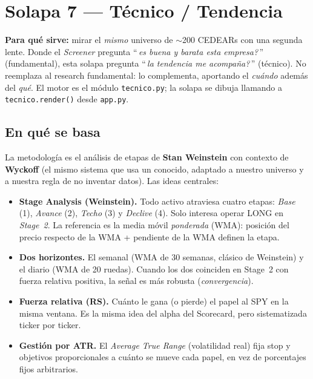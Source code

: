 \documentclass[11pt,a4paper]{article}
\newcommand{\code}[1]{\texttt{#1}}
\newcommand{\fpath}[1]{\texttt{#1}}
\begin{document}
\section{Solapa 7 --- T\'ecnico / Tendencia}

\textbf{Para qu\'e sirve:} mirar el \emph{mismo} universo de $\sim$200 CEDEARs con
una segunda lente. Donde el \emph{Screener} pregunta ``\,\emph{es buena y barata esta
empresa?}\,'' (fundamental), esta solapa pregunta ``\,\emph{la tendencia me
acompa\~na?}\,'' (t\'ecnico). No reemplaza al research fundamental: lo complementa,
aportando el \emph{cu\'ando} adem\'as del \emph{qu\'e}. El motor es el m\'odulo
\fpath{tecnico.py}; la solapa se dibuja llamando a \code{tecnico.render()} desde
\fpath{app.py}.

\subsection{En qu\'e se basa}

La metodolog\'ia es el an\'alisis de etapas de \textbf{Stan Weinstein} con contexto de
\textbf{Wyckoff} (el mismo sistema que usa un conocido, adaptado a nuestro universo y
a nuestra regla de no inventar datos). Las ideas centrales:

\begin{itemize}[leftmargin=1.4em]
  \item \textbf{Stage Analysis (Weinstein).} Todo activo atraviesa cuatro etapas:
  \emph{Base} (1), \emph{Avance} (2), \emph{Techo} (3) y \emph{Declive} (4). Solo
  interesa operar LONG en \emph{Stage~2}. La referencia es la media m\'ovil
  \emph{ponderada} (WMA): posici\'on del precio respecto de la WMA + pendiente de la
  WMA definen la etapa.
  \item \textbf{Dos horizontes.} El semanal (WMA de 30 semanas, cl\'asico de
  Weinstein) y el diario (WMA de 20 ruedas). Cuando los dos coinciden en Stage~2 con
  fuerza relativa positiva, la se\~nal es m\'as robusta (\emph{convergencia}).
  \item \textbf{Fuerza relativa (RS).} Cu\'anto le gana (o pierde) el papel al SPY en
  la misma ventana. Es la misma idea del alpha del Scorecard, pero sistematizada
  ticker por ticker.
  \item \textbf{Gesti\'on por ATR.} El \emph{Average True Range} (volatilidad real)
  fija stop y objetivos proporcionales a cu\'anto se mueve cada papel, en vez de
  porcentajes fijos arbitrarios.
\end{itemize}
\end{document}
